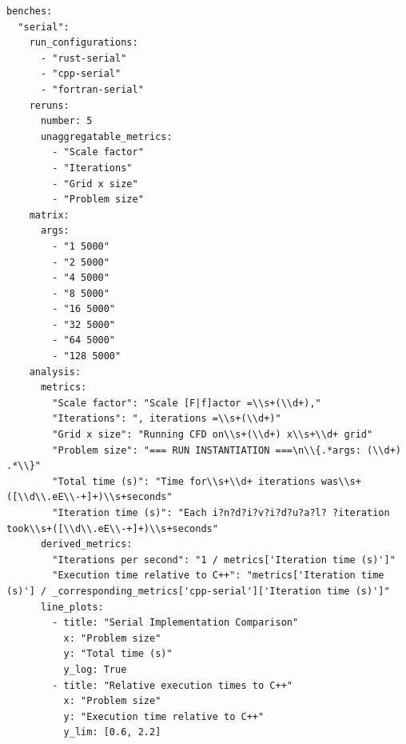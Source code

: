 \begin{listing}[H]
\begin{verbatim}
benches:
  "serial":
    run_configurations:
      - "rust-serial"
      - "cpp-serial"
      - "fortran-serial"
    reruns:
      number: 5
      unaggregatable_metrics:
        - "Scale factor"
        - "Iterations"
        - "Grid x size"
        - "Problem size"
    matrix:
      args:
        - "1 5000"
        - "2 5000"
        - "4 5000"
        - "8 5000"
        - "16 5000"
        - "32 5000"
        - "64 5000"
        - "128 5000"
    analysis:
      metrics:
        "Scale factor": "Scale [F|f]actor =\\s+(\\d+),"
        "Iterations": ", iterations =\\s+(\\d+)"
        "Grid x size": "Running CFD on\\s+(\\d+) x\\s+\\d+ grid"
        "Problem size": "=== RUN INSTANTIATION ===\n\\{.*args: (\\d+) .*\\}"
        "Total time (s)": "Time for\\s+\\d+ iterations was\\s+([\\d\\.eE\\-+]+)\\s+seconds"
        "Iteration time (s)": "Each i?n?d?i?v?i?d?u?a?l? ?iteration took\\s+([\\d\\.eE\\-+]+)\\s+seconds"
      derived_metrics:
        "Iterations per second": "1 / metrics['Iteration time (s)']"
        "Execution time relative to C++": "metrics['Iteration time (s)'] / _corresponding_metrics['cpp-serial']['Iteration time (s)']"
      line_plots:
        - title: "Serial Implementation Comparison"
          x: "Problem size"
          y: "Total time (s)"
          y_log: True
        - title: "Relative execution times to C++"
          x: "Problem size"
          y: "Execution time relative to C++"
          y_lim: [0.6, 2.2]


\end{verbatim}
\end{listing}
